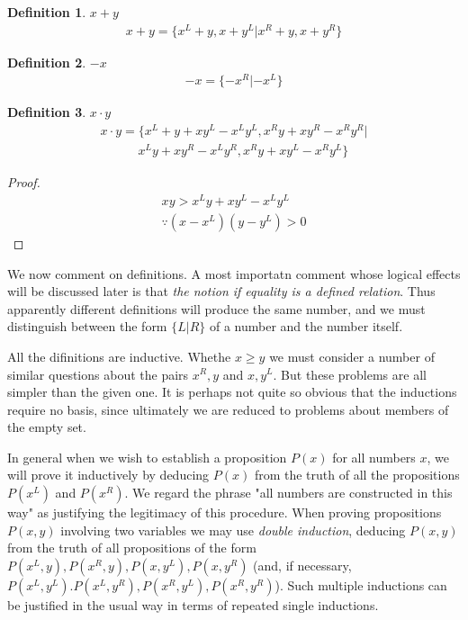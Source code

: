 \documentclass[10pt,a4paper]{book}
\newtheorem{myDef}{Definition}
\begin{document}
\begin{myDef}
	$ x+y $\\
	\begin{gather*}
		x+y = \{x^L+y , x+y^L | x^R+y, x+y^R\}
	\end{gather*}
\end{myDef}
	
	\begin{myDef}
		$ -x $\\
		\begin{gather*}
			-x = \{ -x^R | -x^L \}
		\end{gather*}
	\end{myDef}
	
	\begin{myDef}
		$x\cdot y$\\
		\begin{gather*}
			x\cdot y = \{x^L+y+xy^L-x^Ly^L, x^Ry+xy^R-x^Ry^R|\\
			\qquad\quad x^Ly+xy^R-x^Ly^R, x^Ry+xy^L-x^Ry^L\}
		\end{gather*}
	\end{myDef}
	
	\begin{proof}
		\begin{gather}
			xy>x^Ly+xy^L-x^Ly^L\\
			\because	(x-x^L)(y-y^L)>0
		\end{gather}
	\end{proof}

We now comment on definitions. A most importatn comment whose logical effects will be discussed later is that \textit{the notion if equality is a defined relation}. Thus apparently different definitions will produce the same number, and we must distinguish between the form $ \{L|R\} $ of a number and the number itself.

All the difinitions are inductive. Whethe $  x\ge y $ we must consider a number of similar questions about the pairs $ x^R,y $ and $ x,y^L $. But these problems are all simpler than the given one. It is perhaps not quite so obvious that the inductions require no basis, since ultimately we are reduced to problems about members of the empty set.


In general when we wish to establish a proposition $ P(x) $ for all numbers $ x $, we will prove it inductively by deducing $ P(x) $ from the truth of all the propositions $ P(x^L) $ and $ P(x^R) $. We regard the phrase "all numbers are constructed in this way" as justifying the legitimacy of this procedure. When proving propositions $ P(x,y) $ involving two variables we may use \textit{double induction}, deducing $ P(x,y) $ from the truth of all propositions of the form $ P(x^L,y), P(x^R,y), P(x,y^L), P(x,y^R)$ (and, if necessary, $ P(x^L,y^L). P(x^L,y^R), P(x^R,y^L), P(x^R,y^R) $). Such multiple inductions can be justified in the usual way in terms of repeated single inductions.
\end{document}
